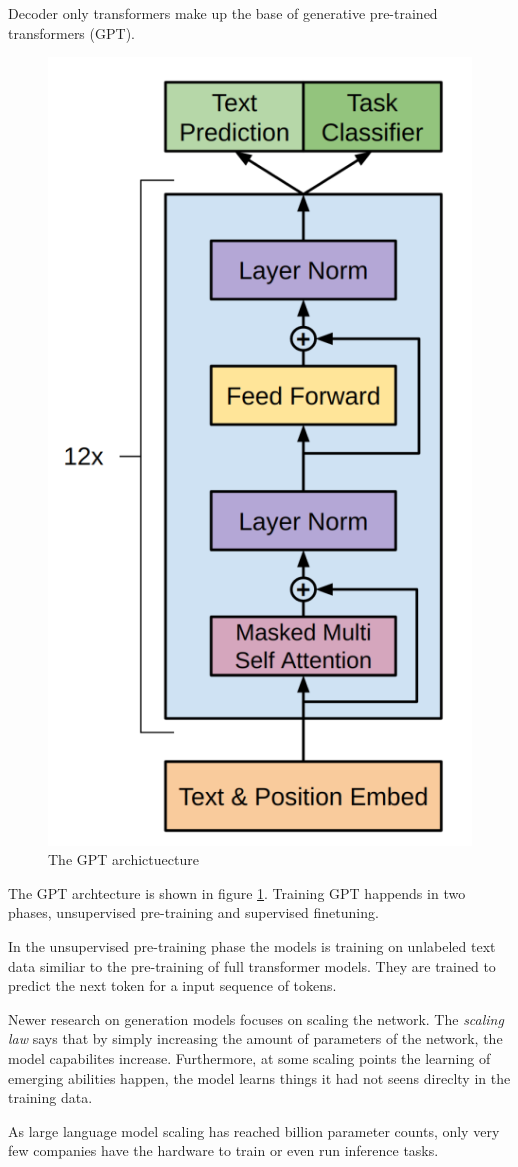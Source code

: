 \documentclass[../../main.tex]{subfiles}
\begin{document}
Decoder only transformers make up the base of generative pre-trained transformers (GPT).

\begin{figure}[t]
	\centering
	\includegraphics[scale=0.3]{include/images/gpt_architecture.png}
	\caption{The GPT archictuecture \cite{Radford2018}}
	\label{fig:gpt_arch}
\end{figure}

The GPT archtecture is shown in figure \ref{fig:gpt_arch}.
Training GPT happends in two phases, unsupervised pre-training and supervised finetuning.

In the unsupervised pre-training phase the models is training on unlabeled text data similiar to the pre-training of full transformer models.
They are trained to predict the next token for a input sequence of tokens.

Newer research on generation models focuses on scaling the network.
The \textit{scaling law} says that by simply increasing the amount of parameters of the network, the model capabilites increase.
Furthermore, at some scaling points the learning of emerging abilities happen, the model learns things it had not seens direclty in the training data.

As large language model scaling has reached billion parameter counts, only very few companies have the hardware to train or even run inference tasks.
\end{document}
